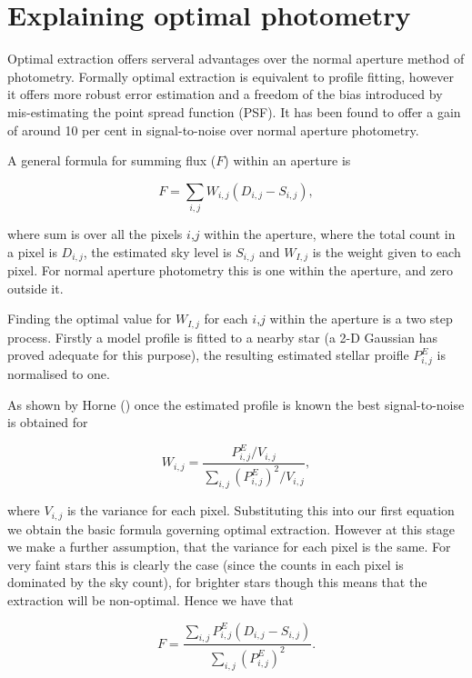 \documentclass[twoside,11pt,nolof]{starlink}
\begin{document}
\section{Explaining \label{explaining}optimal photometry}

Optimal extraction offers serveral advantages over the normal aperture
method of photometry. Formally optimal extraction is equivalent to profile
fitting, however it offers more robust error estimation and a freedom of
the bias introduced by mis-estimating the point spread function (PSF). It has been found to offer a gain of around 10 per cent in signal-to-noise over normal aperture photometry.

A general formula for summing flux ($F$) within an aperture is

\[F=\sum_{i,j}W_{i,j}(D_{i,j}-S_{i,j}),\]

where sum is over all the pixels $i$,$j$ within the aperture, where the total
count in a pixel is $D_{i,j}$, the estimated sky level is $S_{i,j}$ and $W_{I,j}$ is the weight given to each pixel. For normal aperture photometry
this is one within the aperture, and zero outside it.

Finding the optimal value for $W_{I,j}$ for each $i$,$j$ within the aperture is a two step process. Firstly a model profile is fitted to a nearby star (a 2-D Gaussian has proved adequate for this purpose), the resulting estimated stellar proifle $P_{i,j}^{E}$ is normalised to one.

As shown by Horne () once the estimated profile is known the best signal-to-noise is obtained for

\[W_{i,j}=\frac{P_{i,j}^{E}/V_{i,j}}{\sum_{i,j}(P_{i,j}^{E})^2/V_{i,j}},\]

where $V_{i,j}$ is the variance for each pixel. Substituting this into our
first equation we obtain the basic formula governing optimal extraction. However at this stage we make a further assumption, that the variance for each pixel is the same. For very faint stars this is clearly the case (since the counts in each pixel is dominated by the sky count), for brighter stars though this means that the extraction will be non-optimal. Hence we have that

\[F=\frac{\sum_{i,j}P_{i,j}^{E}(D_{i,j}-S_{i,j})}{\sum_{i,j}(P_{i,j}^{E})^2}.\]
\end{document}
